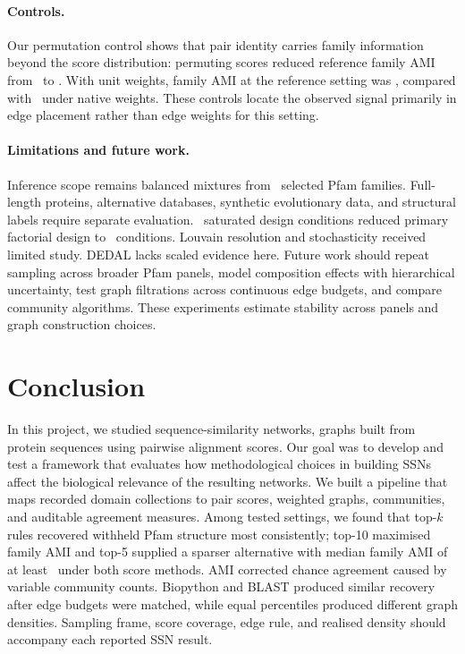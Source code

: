 \documentclass[11pt,a4paper]{article}
\begin{document}
\paragraph{Controls.}
Our permutation control shows that pair identity carries family information
beyond the score distribution: permuting scores reduced reference family AMI
from \ObservedTopFiveAMI\ to \NullTopFiveAMI. With unit weights, family AMI at
the reference setting was \UnweightedTopFiveAMI, compared with
\ObservedTopFiveAMI\ under native weights. These controls locate the observed
signal primarily in edge placement rather than edge weights for this setting.

\paragraph{Limitations and future work.}
Inference scope remains balanced mixtures from \MasterFamilies\ selected Pfam
families. Full-length proteins, alternative databases, synthetic evolutionary
data, and structural labels require separate evaluation. \ExcludedCells\
saturated design conditions reduced primary factorial design to
\PrimaryConditions\ conditions. Louvain resolution and stochasticity received
limited study. DEDAL lacks scaled evidence here.
Future work should repeat sampling across broader Pfam panels, model composition
effects with hierarchical uncertainty, test graph filtrations across continuous
edge budgets, and compare community algorithms. These experiments estimate
stability across panels and graph construction choices.

\section{Conclusion}

In this project, we studied sequence-similarity networks, graphs built from
protein sequences using pairwise alignment scores. Our goal was to develop and
test a framework that evaluates how methodological choices in building SSNs
affect the biological relevance of the resulting networks. We built a pipeline
that maps recorded domain collections to pair scores, weighted graphs,
communities, and auditable agreement measures. Among tested settings, we found
that top-\(k\) rules recovered withheld Pfam structure most consistently; top-10 maximised
family AMI and top-5 supplied a sparser alternative with median family AMI of
at least \TopFiveMinFamilyAMI\ under both score methods. AMI corrected
chance agreement caused by variable community counts. Biopython and BLAST
produced similar recovery after edge budgets were matched, while equal
percentiles produced different graph densities. Sampling frame, score coverage,
edge rule, and realised density should accompany each reported SSN result.
\end{document}

